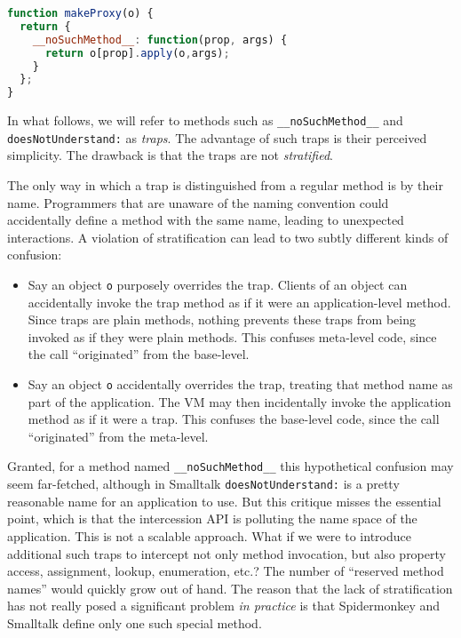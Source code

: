 \documentclass{acm_proc_article-sp}
\newcommand{\noSuchMethod}{\texttt{\_\_noSuchMethod\_\_}}
\begin{document}
\begin{lstlisting}[language=javascript]
function makeProxy(o) {
  return {
    __noSuchMethod__: function(prop, args) {
      return o[prop].apply(o,args);
    }
  };
}
\end{lstlisting}

In what follows, we will refer to methods such as \noSuchMethod{} and \texttt{doesNotUnderstand:} as \emph{traps}. The advantage of such traps is their perceived simplicity. The drawback is that the traps are not \emph{stratified}.

The only way in which a trap is distinguished from a regular method is by their name. Programmers that are unaware of the naming convention could accidentally define a method with the same name, leading to unexpected interactions. A violation of stratification can lead to two subtly different kinds of confusion:

\begin{itemize}
  \item Say an object \texttt{o} purposely overrides the trap. Clients of an object can accidentally invoke the trap method as if it were an application-level method. Since traps are plain methods, nothing prevents these traps from being invoked as if they were plain methods. This confuses meta-level code, since the call ``originated'' from the base-level.
  \item Say an object \texttt{o} accidentally overrides the trap, treating that method name as part of the application. The VM may then incidentally invoke the application method as if it were a trap. This confuses the base-level code, since the call ``originated'' from the meta-level.
\end{itemize}

Granted, for a method named \noSuchMethod{} this hypothetical confusion may seem far-fetched, although in Smalltalk \texttt{doesNotUnderstand:} is a pretty reasonable name for an application to use. But this critique misses the essential point, which is that the intercession API is polluting the name space of the application. This is not a scalable approach. What if we were to introduce additional such traps to intercept not only method invocation, but also property access, assignment, lookup, enumeration, etc.? The number of ``reserved method names'' would quickly grow out of hand. The reason that the lack of stratification has not really posed a significant problem \emph{in practice} is that Spidermonkey and Smalltalk define only one such special method.
\end{document}
